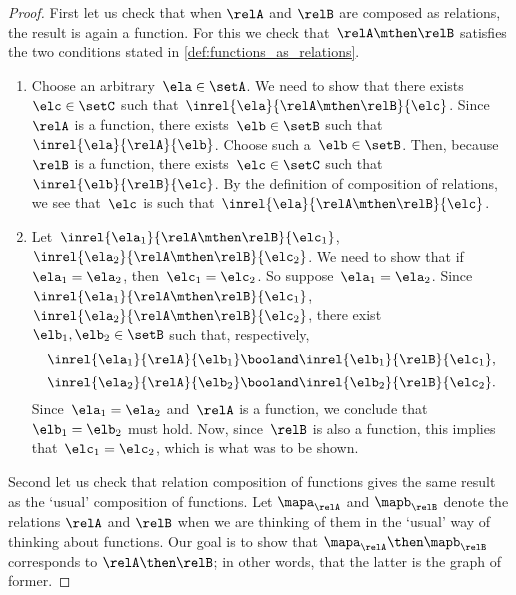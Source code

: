 \begin{proof}
   First let us check that when $\relA$ and $\relB$ are composed as relations, the result is again a function. For this we check that~$\relA \mthen \relB$ satisfies the two conditions stated in \cref{def:functions_as_relations}.

    \begin{enumerate}
        \item Choose an arbitrary~$\ela \in \setA$.
              We need to show that there exists~$\elc \in \setC$ such that~$\inrel{\ela}{\relA \mthen \relB}{\elc}$.
              Since~$\relA$ is a function, there exists~$\elb \in \setB$ such that~$\inrel{\ela}{\relA}{\elb}$.
              Choose such a~$\elb \in \setB$.
              Then, because~$\relB$ is a function, there exists~$\elc \in \setC$ such that~$\inrel{\elb}{\relB}{\elc}$.
              By the definition of composition of relations, we see that~$\elc$ is such that~$\inrel{\ela}{\relA \mthen \relB}{\elc}$.
        \item Let~$\inrel{\ela_1}{\relA \mthen \relB}{\elc_1}$,~$\inrel{\ela_2}{\relA \mthen \relB}{\elc_2}$.
              We need to show that if~$\ela_1 = \ela_2$, then~$\elc_1 = \elc_2$.
              So suppose~$\ela_1 = \ela_2$.
              Since~$\inrel{\ela_1}{\relA \mthen \relB}{\elc_1}$,~$\inrel{\ela_2}{\relA \mthen \relB}{\elc_2}$, there exist~$\elb_1, \elb_2 \in \setB$ such that, respectively,
              \begin{equation*}
                  \inrel{\ela_1}{\relA}{\elb_1} \booland \inrel{\elb_1}{\relB}{\elc_1},
              \end{equation*}
              \begin{equation*}
                  \inrel{\ela_2}{\relA}{\elb_2} \booland \inrel{\elb_2}{\relB}{\elc_2}.
              \end{equation*}
              Since~$\ela_1 = \ela_2$ and~$\relA$ is a function, we conclude that~$\elb_1 = \elb_2$ must hold.
              Now, since~$\relB$ is also a function, this implies that~$\elc_1 = \elc_2$, which is what was to be shown.
    \end{enumerate}

    Second let us check that relation composition of functions gives the same result as the `usual' composition of functions.
    Let $\mapa_\relA$ and $\mapb_\relB$ denote the relations $\relA$ and $\relB$ when we are thinking of them in the `usual' way of thinking about functions. Our goal is to show that $\mapa_\relA \then \mapb_\relB$ corresponds to $\relA \then \relB$; in other words, that the latter is the graph of former.


\end{proof}
